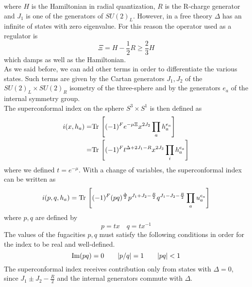  where $H$ is the Hamiltonian in radial quantization, $R$ is the R-charge generator and $J_1$ is one of the generators of $SU(2)_L$. 
 However, in a free theory $\Delta$ has an infinite of states with zero eigenvalue. 
 For this reason the operator used as a regulator is \cite{Romelsberger:2005eg}
 \begin{equation}
 	\Xi = H - \frac{1}{2} R \geq \frac{2}{3} H 
 \end{equation}
 which damps as well as the Hamiltonian.\\
As we said before, we can add other terms in order to differentiate the various states.
Such terms are given by the Cartan generators $J_1, J_2$ of the $SU(2)_L \times SU(2)_R$ isometry of the three-sphere and by the generators $e_a$ of the internal symmetry group.\\
The superconformal index on the sphere $S^3 \times S^1$ is then defined as \cite{Romelsberger:2007ec}
\begin{align}
 i( x, h_a) =&
\mathrm{Tr } \, \left[ (-1)^F  e^{ - \mu \Xi} x^{2 J_2} \prod_a h_a^{e_a} \right] \\= &
\mathrm{Tr } \, \left[ (-1)^F  t^{\Delta +  2 J_1 - R} x^{2 J_2} \prod_i h_a^{e_a} \right] 
 \end{align} 
 where we defined $t = e^{- \mu}$.
With a change of variables, the superconformal index can be written as 
\begin{equation}
 i( p, q, h_a) =
 \Tr  \left[  (-1)^F 
 (pq)^{ \frac{\Delta}{2}} %
  p^{J_1 + J_2 - \frac{R}{2}} q^{J_1 - J_2 - \frac{R}{2} } \prod_a u_a^{e_a}    \right]
\end{equation}
where $p,q$ are defined by
\begin{equation}
p = t x \quad q = t x^{-1}
\end{equation}
The values of the fugacities $p,q$ must satisfy the following conditions in order for the index to be real and well-defined.
\begin{equation}
\hbox{Im} (pq) =0 \qquad |p/q| =  1 \qquad | pq| < 1
\label{eqn:reality_convergence_condition_index}
\end{equation}
The superconformal index receives contribution only from states with $\Delta=0$, since $J_1 \pm J_2 - \frac{R}{2}$ and the internal generators commute with $\Delta$.

